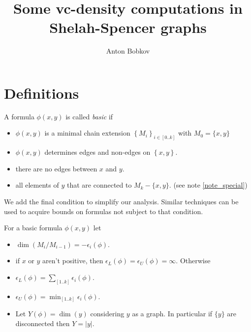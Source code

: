 \documentclass{amsart}
\title{Some vc-density computations in Shelah-Spencer graphs}
\author{Anton Bobkov}
\newcommand{\curly}[1]{\left\{#1\right\}}
\newcommand{\paren}[1]{\left(#1\right)}
\begin{document}
\maketitle

\section{Definitions}

\begin{Definition}
	A formula $\phi(x, y)$ is called \emph{basic} if
	\begin{itemize}
		\item $\phi(x, y)$ is a minimal chain extension $\curly{M_i}_{i \in [0..k]}$ with $M_0 = \{x, y\}$
		\item $\phi(x, y)$ determines edges and non-edges on $\curly{x, y}$.
		\item there are no edges between $x$ and $y$.
		\item all elements of $y$ that are connected to $M_k - \{x,y\}$. (see note \ref{note_special})
	\end{itemize}
\end{Definition}




\begin{Note} \label{note_special}
	We add the final condition to simplify our analysis. Similar techniques can be used to acquire bounds on formulas not subject to that condition.
\end{Note}

\begin{Definition}
	For a basic formula $\phi(x, y)$ let
	\begin{itemize}
		\item $\dim \paren{M_i/M_{i-1}} = -\epsilon_i(\phi)$.
		\item if $x$ or $y$ aren't positive, then $\epsilon_L(\phi) = \epsilon_U(\phi) = \infty$. Otherwise
		\item $\epsilon_L(\phi) = \sum_{[1..k]} \epsilon_i(\phi)$.
		\item $\epsilon_U(\phi) = \min_{[1..k]} \epsilon_i(\phi)$.
		\item Let $Y(\phi) = \dim (y)$ considering $y$ as a graph.
		In particular if $\{y\}$ are disconnected then $Y = |y|$.
	\end{itemize}
\end{Definition}
\end{document}
